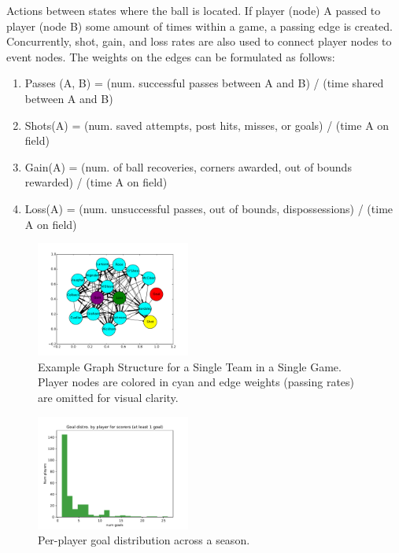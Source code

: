  Actions between states where the ball is located. If player (node) A passed to player (node B) some amount of times within a game, a passing edge is created. Concurrently, shot, gain, and loss rates are also used to connect player nodes to event nodes. The weights on the edges can be formulated as follows: 

\begin{enumerate}

    \item Passes (A, B) = (num. successful passes between A and B) / (time shared between A and B)

    \item Shots(A) = (num. saved attempts, post hits, misses, or goals) / (time A on field) 

    \item Gain(A) = (num. of ball recoveries, corners awarded, out of bounds rewarded) / (time A on field) 

    \item Loss(A) = (num. unsuccessful passes, out of bounds, dispossessions) / (time A on field) 

\end{enumerate}


\begin{figure}[h]
  \centering
  \includegraphics[width=0.45\textwidth]{plots/soccer_networkx.pdf}
  \caption{Example Graph Structure for a Single Team in a Single Game. Player nodes are colored in cyan and edge weights (passing rates) are omitted for visual clarity.}
\end{figure}


\begin{figure}[h]
  \centering
  \includegraphics[width=0.45\textwidth]{plots/eplper_player_goal_hist.pdf}
  \caption{Per-player goal distribution across a season.}
\end{figure}

